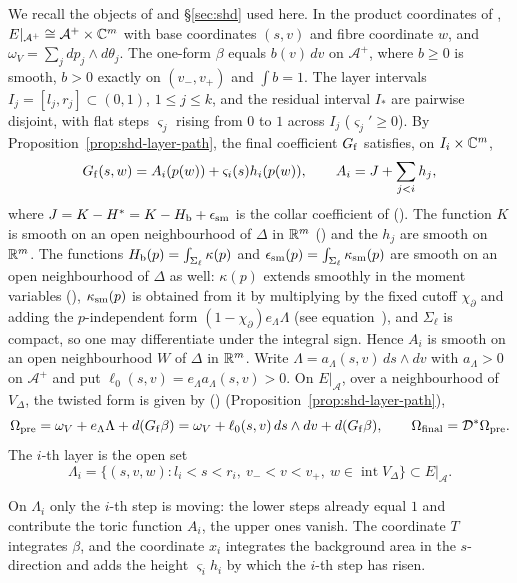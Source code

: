 We recall the objects of  and \S\ref{sec:shd} used here. In the product coordinates of
, $E|_{\mathcal A^+}\cong\mathcal A^+\times\mathbb{C}^m$ with base coordinates $(s,v)$ and fibre
coordinate $w$, and $\omega_V=\sum_jdp_j\wedge d\theta_j$. The one-form $\beta$ equals $b(v)\,dv$ on $\mathcal A^+$, where $b\ge0$
is smooth, $b>0$ exactly on $(v_-,v_+)$ and $\int b=1$. The layer intervals $I_j=[l_j,r_j]\subset(0,1)$,
$1\le j\le k$, and the residual interval $I_*$ are pairwise disjoint, with flat steps $\varsigma_j$ rising from $0$ to $1$ across
$I_j$ ($\varsigma_j'\ge0$). By Proposition~\ref{prop:shd-layer-path}, the final coefficient $G_{\rm f}$ satisfies, on
$I_i\times\mathbb{C}^m$,
\begin{equation}\label{eq:str-Gf}
 G_{\rm f}(s,w)=A_i(p(w))+\varsigma_i(s)h_i(p(w)),\qquad A_i=J+\sum_{j<i}h_j ,
\end{equation}
where $J=K-H^*=K-H_{\mathrm b}+\epsilon_{\rm sm}$ is the collar coefficient of (). The function $K$ is smooth on an open
neighbourhood of $\Delta$ in $\mathbb{R}^m$ () and the $h_j$ are smooth on $\mathbb{R}^m$. The functions
$H_{\mathrm b}(p)=\int_{\Sigma_\ell}\kappa(p)$ and $\epsilon_{\rm sm}(p)=\int_{\Sigma_\ell}\kappa_{\rm sm}(p)$ are smooth on an open neighbourhood of $\Delta$ as
well: $\kappa(p)$ extends smoothly in the moment variables (), $\kappa_{\rm sm}(p)$ is obtained from it by
multiplying by the fixed cutoff $\chi_\partial$ and adding the $p$-independent form $(1-\chi_\partial)e_\Lambda\Lambda$
(see equation~), and $\Sigma_\ell$ is compact, so one may differentiate under the integral sign. Hence $A_i$ is smooth on an
open neighbourhood $W$ of $\Delta$ in $\mathbb{R}^m$. Write $\Lambda=a_\Lambda(s,v)\,ds\wedge dv$ with $a_\Lambda>0$ on $\mathcal A^+$ and put
$\ell_0(s,v)=e_\Lambda a_\Lambda(s,v)>0$. On $E|_{\mathcal A}$, over a neighbourhood of $V_\Delta$, the twisted form is
given by () (Proposition~\ref{prop:shd-layer-path}),
\begin{equation}\label{eq:str-pre}
 \Omega_{\rm pre}=\omega_V+e_\Lambda\Lambda+d(G_{\rm f}\beta)=\omega_V+\ell_0(s,v)\,ds\wedge dv+d(G_{\rm f}\beta),\qquad
 \Omega_{\rm final}=\mathcal D^*\Omega_{\rm pre}.
\end{equation}
The $i$-th layer is the open set
\[
 \Lambda_i=\{(s,v,w):l_i<s<r_i,\ v_-<v<v_+,\ w\in\operatorname{int}V_\Delta\}\subset E|_{\mathcal A}.
\]

On $\Lambda_i$ only the $i$-th step is moving: the lower steps already equal $1$ and contribute the toric function $A_i$,
the upper ones vanish. The coordinate $T$ integrates $\beta$, and the coordinate $x_i$ integrates the background area in
the $s$-direction and adds the height $\varsigma_ih_i$ by which the $i$-th step has risen.

